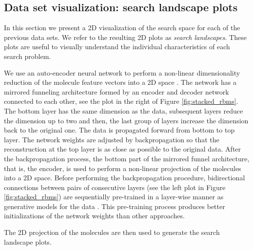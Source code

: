 \subsection{Data set visualization: search landscape plots}

In this section we present a 2D visualization of the search space for each of
the previous data sets. We refer to the resulting 2D plots as \emph{search
landscapes}. These plots are useful to visually understand the individual
characteristics of each search problem. 

We use an
auto-encoder neural network to perform a non-linear dimensionality reduction of the molecule feature vectors
into a 2D space \cite{Hinton_2006}. The network has a mirrored
funneling architecture formed by an encoder and decoder network connected to
each other, see the plot in the
right of Figure \ref{fig:stacked_rbms}. The bottom layer has the same dimension as the data, subsequent
layers reduce the dimension up to two and then, the last group of layers
increase the dimension back to the original one. 
The data is propagated forward from bottom to top layer. The network
weights are adjusted by backpropagation so that the reconstruction at the top
layer is as close as possible to the original data. After
the backpropagation process, the bottom part of the mirrored funnel architecture, that is, the
encoder, is used to perform a non-linear projection of the molecules into a 2D
space. Before performing the backpropagation procedure, bidirectional
connections between pairs of consecutive layers (see the left plot in Figure
\ref{fig:stacked_rbms}) are sequentially pre-trained in a layer-wise manner as
generative models for the data \cite{Hinton_2006}. This pre-training process
produces better initializations of the network weights than other approaches.

The 2D projection of the molecules are then used to generate the search
landscape plots.

